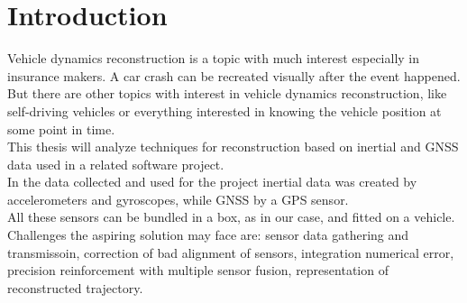 \chapter{Introduction}
\label{chap:intro}

Vehicle dynamics reconstruction is a topic with much interest especially in insurance makers. A car crash can be recreated visually after the event happened. But there are other topics with interest in vehicle dynamics reconstruction, like self-driving vehicles or everything interested in knowing the vehicle position at some point in time. \\
This thesis will analyze techniques for reconstruction based on inertial and GNSS data used in a related software project. \\
In the data collected and used for the project inertial data was created by accelerometers and gyroscopes, while GNSS by a GPS sensor. \\
All these sensors can be bundled in a box, as in our case, and fitted on a vehicle. \\


Challenges the aspiring solution may face are: sensor data gathering and transmissoin, correction of bad alignment of sensors, integration numerical error, precision reinforcement with multiple sensor fusion, representation of reconstructed trajectory.

